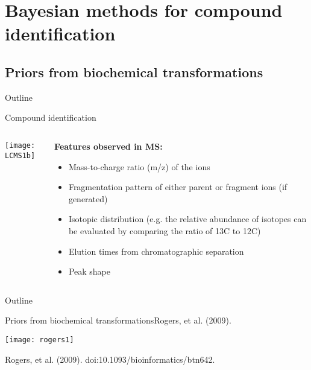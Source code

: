 \documentclass[xcolor=dvipsnames]{beamer}
\begin{document}
\section{Bayesian methods for compound identification}
\subsection{Priors from biochemical transformations}
\begin{frame}{Outline}
	\vspace{-10.5pt}
	\tableofcontents[currentsection,subsectionstyle=hide]
\end{frame}

\begin{frame}{Compound identification}
	\begin{columns}
		\begin{column}{0.45\textwidth}
			\vspace{-35pt}
			\begin{center}
				\texttt{[image: LCMS1b]}
			\end{center}
		\end{column}
		\begin{column}{0.55\textwidth}
			\textbf{Features observed in MS:}
			\begin{itemize}
				\item Mass-to-charge ratio (m/z) of the ions
				\item Fragmentation pattern of either parent or fragment ions (if generated)
				\item Isotopic distribution (e.g. the relative abundance of isotopes can be evaluated by comparing the ratio of 13C to 12C)
				\item Elution times from chromatographic separation 
				\item Peak shape
			\end{itemize}
		\end{column}
	\end{columns}
\end{frame}

\begin{frame}{Outline}
	\vspace{-10.5pt}
	\tableofcontents[currentsection,subsectionstyle=show/shaded/hide]
\end{frame}

\begin{frame}{Priors from biochemical transformations}{Rogers, et al. (2009).}
	\vspace{-15pt}
	\begin{center}
		\texttt{[image: rogers1]}
		
		Rogers, et al. (2009). doi:10.1093/bioinformatics/btn642.
	\end{center}
\end{frame}
\end{document}
